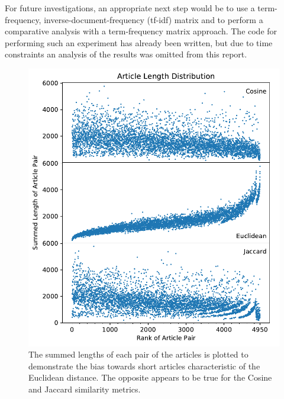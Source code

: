 \documentclass[11pt]{article}
\begin{document}
For future investigations, an appropriate next step would be to use a term-frequency, inverse-document-frequency (tf-idf) matrix and to perform a comparative analysis with a term-frequency matrix approach.
The code for performing such an experiment has already been written, but due to time constraints an analysis of the results was omitted from this report.

\begin{figure}[h] \label{fig:articlelengths}
  \centering
  \includegraphics[width=\textwidth]{figures/article_length_dist}
  \caption{The summed lengths of each pair of the articles is plotted to demonstrate the bias towards short articles characteristic of the Euclidean distance. The opposite appears to be true for the Cosine and Jaccard similarity metrics.}
\end{figure}

{}

\end{document}
